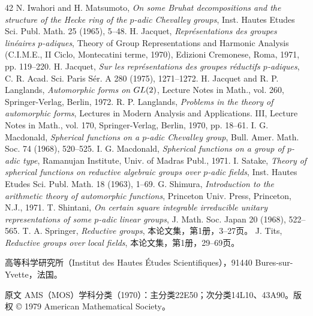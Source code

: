 \begin{thebibliography}{42}
 N. Iwahori and H. Matsumoto, \emph{On some Bruhat decompositions and the structure of the Hecke ring of the $p$-adic Chevalley groups}, Inst. Hautes Etudes Sci. Publ. Math. 25 (1965), 5--48.
 H. Jacquet, \emph{Représentations des groupes linéaires $p$-adiques}, Theory of Group Representations and Harmonic Analysis (C.I.M.E., II Ciclo, Montecatini terme, 1970), Edizioni Cremonese, Roma, 1971, pp. 119--220.
 H. Jacquet, \emph{Sur les représentations des groupes réductifs $p$-adiques}, C. R. Acad. Sci. Paris Sér. A 280 (1975), 1271--1272.
 H. Jacquet and R. P. Langlands, \emph{Automorphic forms on $GL(2)$}, Lecture Notes in Math., vol. 260, Springer-Verlag, Berlin, 1972.
 R. P. Langlands, \emph{Problems in the theory of automorphic forms}, Lectures in Modern Analysis and Applications. III, Lecture Notes in Math., vol. 170, Springer-Verlag, Berlin, 1970, pp. 18--61.
 I. G. Macdonald, \emph{Spherical functions on a $p$-adic Chevalley group}, Bull. Amer. Math. Soc. 74 (1968), 520--525.
 I. G. Macdonald, \emph{Spherical functions on a group of $p$-adic type}, Ramanujan Institute, Univ. of Madras Publ., 1971.
 I. Satake, \emph{Theory of spherical functions on reductive algebraic groups over $p$-adic fields}, Inst. Hautes Etudes Sci. Publ. Math. 18 (1963), 1--69.
 G. Shimura, \emph{Introduction to the arithmetic theory of automorphic functions}, Princeton Univ. Press, Princeton, N.J., 1971.
 T. Shintani, \emph{On certain square integrable irreducible unitary representations of some $p$-adic linear groups}, J. Math. Soc. Japan 20 (1968), 522--565.
 T. A. Springer, \emph{Reductive groups}, 本论文集，第1册，3--27页。
 J. Tits, \emph{Reductive groups over local fields}, 本论文集，第1册，29--69页。
\end{thebibliography}
\noindent 高等科学研究所（Institut des Hautes Études Scientifiques），91440 Bures-sur-Yvette，法国。
\par\noindent\footnotesize 原文 AMS（MOS）学科分类（1970）：主分类22E50；次分类14L10、43A90。版权 © 1979 American Mathematical Society。\normalsize
